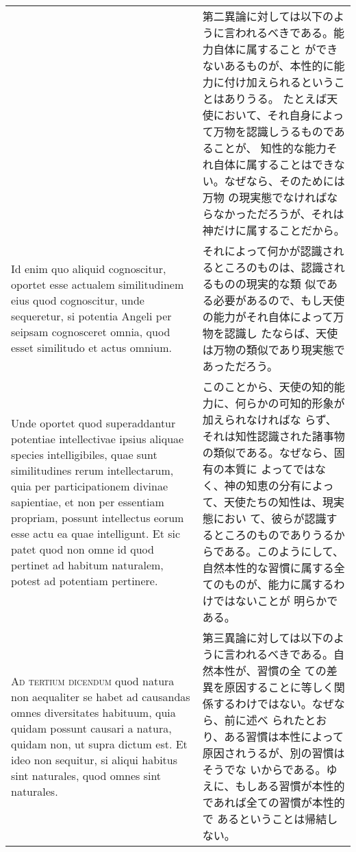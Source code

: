 \documentclass[10pt]{jsarticle} %
\begin{document}
\begin{longtable}{p{21em}p{21em}}
&

第二異論に対しては以下のように言われるべきである。能力自体に属すること
ができないあるものが、本性的に能力に付け加えられるということはありうる。
たとえば天使において、それ自身によって万物を認識しうるものであることが、
知性的な能力それ自体に属することはできない。なぜなら、そのためには万物
の現実態でなければならなかっただろうが、それは神だけに属することだから。

\\



Id enim quo aliquid cognoscitur, oportet esse actualem similitudinem
eius quod cognoscitur, unde sequeretur, si potentia Angeli per seipsam
cognosceret omnia, quod esset similitudo et actus omnium.

&

それによって何かが認識されるところのものは、認識されるものの現実的な類
似である必要があるので、もし天使の能力がそれ自体によって万物を認識し
たならば、天使は万物の類似であり現実態であっただろう。

\\


Unde oportet quod superaddantur potentiae intellectivae ipsius aliquae
species intelligibiles, quae sunt similitudines rerum intellectarum,
quia per participationem divinae sapientiae, et non per essentiam
propriam, possunt intellectus eorum esse actu ea quae intelligunt. Et
sic patet quod non omne id quod pertinet ad habitum naturalem, potest
ad potentiam pertinere.

&

このことから、天使の知的能力に、何らかの可知的形象が加えられなければな
 らず、それは知性認識された諸事物の類似である。なぜなら、固有の本質に
 よってではなく、神の知恵の分有によって、天使たちの知性は、現実態におい
 て、彼らが認識するところのものでありうるからである。このようにして、
 自然本性的な習慣に属する全てのものが、能力に属するわけではないことが
 明らかである。

\\





{\scshape Ad tertium dicendum} quod natura non aequaliter se habet ad
causandas omnes diversitates habituum, quia quidam possunt causari a
natura, quidam non, ut supra dictum est. Et ideo non sequitur, si
aliqui habitus sint naturales, quod omnes sint naturales.

&

第三異論に対しては以下のように言われるべきである。自然本性が、習慣の全
ての差異を原因することに等しく関係するわけではない。なぜなら、前に述べ
られたとおり、ある習慣は本性によって原因されうるが、別の習慣はそうでな
いからである。ゆえに、もしある習慣が本性的であれば全ての習慣が本性的で
あるということは帰結しない。

\end{longtable}
\newpage
\end{document}
